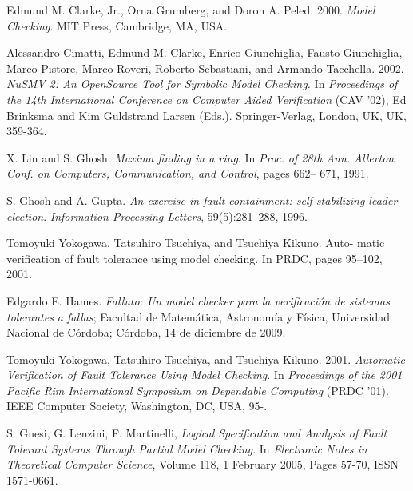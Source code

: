 \documentclass{llncs2e/llncs}
\begin{document}


%
%
\begin{thebibliography}{9}

    Edmund M. Clarke, Jr., Orna Grumberg, and Doron A. Peled. 2000.
    \emph{Model Checking}. MIT Press, Cambridge, MA, USA. 

    Alessandro Cimatti, Edmund M. Clarke, Enrico Giunchiglia, Fausto
    Giunchiglia, Marco Pistore, Marco Roveri, Roberto Sebastiani, and Armando
    Tacchella. 2002. \emph{NuSMV 2: An OpenSource Tool for Symbolic Model
    Checking.} In \emph{Proceedings of the 14th International Conference on
    Computer Aided Verification} (CAV '02), Ed Brinksma and Kim Guldstrand
    Larsen (Eds.). Springer-Verlag, London, UK, UK, 359-364. 

    X. Lin and S. Ghosh. \emph{Maxima finding in a ring}. In \emph{Proc. of 28th Ann.
    Allerton Conf. on Computers, Communication, and Control}, pages 662–
    671, 1991.

    S. Ghosh and A. Gupta. \emph{An exercise in fault-containment: self-stabilizing
    leader election}. \emph{Information Processing Letters}, 59(5):281–288, 1996.

    Tomoyuki Yokogawa, Tatsuhiro Tsuchiya, and Tsuchiya Kikuno. Auto-
    matic verification of fault tolerance using model checking. In PRDC,
    pages 95–102, 2001.
    
    Edgardo E. Hames. \emph{Falluto: Un model checker para la verificaci\'on de sistemas tolerantes a fallas}; Facultad de Matem\'atica, Astronom\'ia y F\'isica, Universidad Nacional de C\'ordoba; C\'ordoba, 14 de diciembre de 2009.

 Tomoyuki Yokogawa, Tatsuhiro Tsuchiya, and Tsuchiya Kikuno. 2001. \emph{Automatic Verification of Fault Tolerance Using Model Checking}.  In \emph{Proceedings of the 2001 Pacific Rim International Symposium on Dependable Computing} (PRDC '01). IEEE Computer Society, Washington, DC, USA,  95-.

 S. Gnesi, G. Lenzini, F. Martinelli, \emph{Logical Specification and Analysis of Fault Tolerant Systems Through Partial Model Checking}. In \emph{Electronic Notes in Theoretical Computer Science}, Volume 118, 1 February 2005, Pages 57-70, ISSN 1571-0661.


\end{thebibliography}
\end{document}
